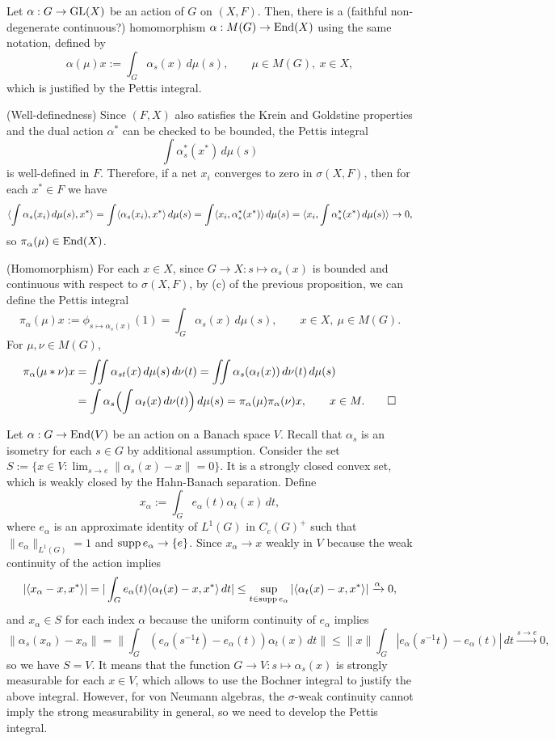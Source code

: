 \documentclass{../../../small}
\begin{document}
\begin{prop}[Averaging]
Let $\alpha:G\to\mathrm{GL}(X)$ be an action of $G$ on $(X,F)$.
Then, there is a (faithful non-degenerate continuous?) homomorphism $\alpha:M(G)\to\operatorname{End}(X)$ using the same notation, defined by
\[\alpha(\mu)x:=\int_G\alpha_s(x)\,d\mu(s),\qquad\mu\in M(G),\ x\in X,\]
which is justified by the Pettis integral.
\end{prop}
\begin{pf}
(Well-definedness)
Since $(F,X)$ also satisfies the Krein and Goldstine properties and the dual action $\alpha^*$ can be checked to be bounded, the Pettis integral
\[\int\alpha_s^*(x^*)\,d\mu(s)\]
is well-defined in $F$.
Therefore, if a net $x_i$ converges to zero in $\sigma(X,F)$, then for each $x^*\in F$ we have
\[\langle\int\alpha_s(x_i)\,d\mu(s),x^*\rangle
=\int\langle\alpha_s(x_i),x^*\rangle\,d\mu(s)
=\int\langle x_i,\alpha_s^*(x^*)\rangle\,d\mu(s)
=\langle x_i,\int\alpha_s^*(x^*)\,d\mu(s)\rangle\to0,\]
so $\pi_\alpha(\mu)\in\operatorname{End}(X)$.

(Homomorphism)
For each $x\in X$, since $G\to X:s\mapsto\alpha_s(x)$ is bounded and continuous with respect to $\sigma(X,F)$, by (c) of the previous proposition, we can define the Pettis integral
\[\pi_\alpha(\mu)x:=\phi_{s\mapsto\alpha_s(x)}(1)=\int_G\alpha_s(x)\,d\mu(s),\qquad x\in X,\ \mu\in M(G).\]
For $\mu,\nu\in M(G)$,
\begin{align*}
\pi_\alpha(\mu*\nu)x
&=\iint\alpha_{st}(x)\,d\mu(s)\,d\nu(t)=\iint\alpha_s(\alpha_t(x))\,d\nu(t)\,d\mu(s)\\
&=\int\alpha_s\Bigl(\int\alpha_t(x)\,d\nu(t)\Bigr)\,d\mu(s)=\pi_\alpha(\mu)\pi_\alpha(\nu)x,\qquad x\in M.\qedhere
\end{align*}




\end{pf}
\begin{rmk*}
Let $\alpha:G\to\operatorname{End}(V)$ be an action on a Banach space $V$.
Recall that $\alpha_s$ is an isometry for each $s\in G$ by additional assumption.
Consider the set $S:=\{x\in V:\lim_{s\to e}\|\alpha_s(x)-x\|=0\}$.
It is a strongly closed convex set, which is weakly closed by the Hahn-Banach separation.
Define
\[x_\alpha:=\int_Ge_\alpha(t)\alpha_t(x)\,dt,\]
where $e_\alpha$ is an approximate identity of $L^1(G)$ in $C_c(G)^+$ such that $\|e_\alpha\|_{L^1(G)}=1$ and $\operatorname{supp} e_\alpha\to\{e\}$.
Since $x_\alpha\to x$ weakly in $V$ because the weak continuity of the action implies
\[|\langle x_\alpha-x,x^*\rangle|=|\int_Ge_\alpha(t)\langle\alpha_t(x)-x,x^*\rangle\,dt|\le\sup_{t\in\operatorname{supp} e_\alpha}|\langle\alpha_t(x)-x,x^*\rangle|\xrightarrow{\alpha}0,\]
and $x_\alpha\in S$ for each index $\alpha$ because the uniform continuity of $e_\alpha$ implies
\[\|\alpha_s(x_\alpha)-x_\alpha\|=\|\int_G(e_\alpha(s^{-1}t)-e_\alpha(t))\alpha_t(x)\,dt\|\le\|x\|\int_G|e_\alpha(s^{-1}t)-e_\alpha(t)|\,dt\xrightarrow{s\to e}0,\]
so we have $S=V$.
It means that the function $G\to V:s\mapsto\alpha_s(x)$ is strongly measurable for each $x\in V$, which allows to use the Bochner integral to justify the above integral.
However, for von Neumann algebras, the $\sigma$-weak continuity cannot imply the strong measurability in general, so we need to develop the Pettis integral.
\end{rmk*}
\end{document}

